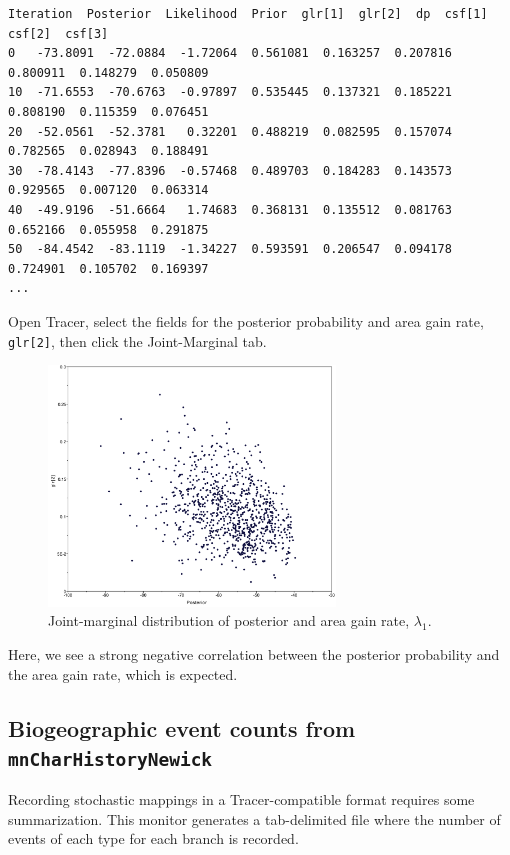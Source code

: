 \documentclass[11pt]{article}
\begin{document}
\begin{framed}
\begin{lstlisting}[basicstyle=\tiny \listingsfont, columns=texcl]
Iteration  Posterior  Likelihood  Prior  glr[1]  glr[2]  dp  csf[1]  csf[2]  csf[3]
0   -73.8091  -72.0884  -1.72064  0.561081  0.163257  0.207816  0.800911  0.148279  0.050809
10  -71.6553  -70.6763  -0.97897  0.535445  0.137321  0.185221  0.808190  0.115359  0.076451
20  -52.0561  -52.3781   0.32201  0.488219  0.082595  0.157074  0.782565  0.028943  0.188491
30  -78.4143  -77.8396  -0.57468  0.489703  0.184283  0.143573  0.929565  0.007120  0.063314
40  -49.9196  -51.6664   1.74683  0.368131  0.135512  0.081763  0.652166  0.055958  0.291875
50  -84.4542  -83.1119  -1.34227  0.593591  0.206547  0.094178  0.724901  0.105702  0.169397
...
\end{lstlisting}
\end{framed}

Open Tracer, select the fields for the posterior probability and area gain rate, {\tt glr[2]}, then click the Joint-Marginal tab.

\begin{figure}[H]
\centering
\includegraphics[width=3in]{figures/joint_rgain_posterior}
\caption{Joint-marginal distribution of posterior and area gain rate, $\lambda_1$.}
\end{figure}

Here, we see a strong negative correlation between the posterior probability and the area gain rate, which is expected.

\subsection{Biogeographic event counts from {\tt mnCharHistoryNewick}}

Recording stochastic mappings in a Tracer-compatible format requires some summarization.
This monitor generates a tab-delimited file where the number of events of each type for each branch is recorded.
\end{document}
